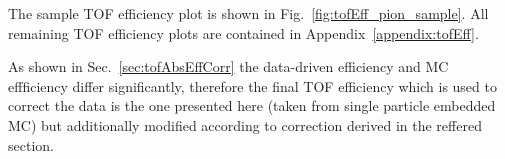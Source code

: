 The sample TOF efficiency plot is shown in Fig.~\ref{fig:tofEff_pion_sample}. All remaining TOF efficiency plots are contained in Appendix~\ref{appendix:tofEff}.

As shown in Sec.~\ref{sec:tofAbsEffCorr} the data-driven efficiency and MC effficiency differ significantly, therefore the final TOF efficiency which is used to correct the data is the one presented here (taken from single particle embedded MC) but additionally modified according to correction derived in the reffered section.

\begin{figure}[H]%
	\centering
	\parbox{0.485\textwidth}{
		\centering
		\begin{subfigure}[b]{\linewidth}
		\end{subfigure}\\[5pt]
		\begin{subfigure}[b]{\linewidth}\addtocounter{subfigure}{1}

\end{subfigure}}
\end{figure}
